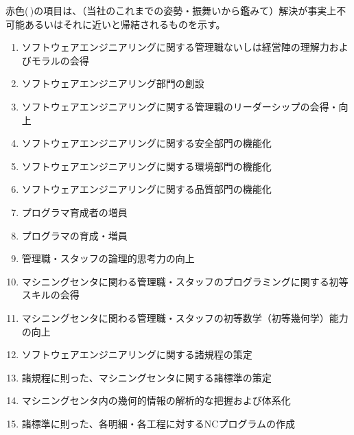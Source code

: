 \clearpage
赤色(\,\sarrow[red]\!)の項目は、（当社のこれまでの姿勢・振舞いから鑑みて）解決が事実上不可能あるいはそれに近いと帰結されるものを示す。
\begin{enumerate}[label=\sarrow]
\item[{\sarrow[red]}] ソフトウェアエンジニアリングに関する管理職ないしは経営陣の理解力およびモラルの会得
\item[{\sarrow[red]}] ソフトウェアエンジニアリング部門の創設
\item[{\sarrow[red]}] ソフトウェアエンジニアリングに関する管理職のリーダーシップの会得・向上
\item[{\sarrow[red]}] ソフトウェアエンジニアリングに関する安全部門の機能化
\item[{\sarrow[red]}] ソフトウェアエンジニアリングに関する環境部門の機能化
\item[{\sarrow[red]}] ソフトウェアエンジニアリングに関する品質部門の機能化
\item[{\sarrow[red]}] プログラマ育成者の増員
\item[{\sarrow[red]}] プログラマの育成・増員
\item[{\sarrow[red]}] 管理職・スタッフの論理的思考力の向上
\item[{\sarrow[red]}] マシニングセンタに関わる管理職・スタッフのプログラミングに関する初等スキルの会得
\item[{\sarrow[red]}] マシニングセンタに関わる管理職・スタッフの初等数学（初等幾何学）能力の向上
\item ソフトウェアエンジニアリングに関する諸規程の策定
\item 諸規程に則った、マシニングセンタに関する諸標準の策定
\item マシニングセンタ内の幾何的情報の解析的な把握および体系化
\item 諸標準に則った、各明細・各工程に対するNCプログラムの作成
\end{enumerate}


